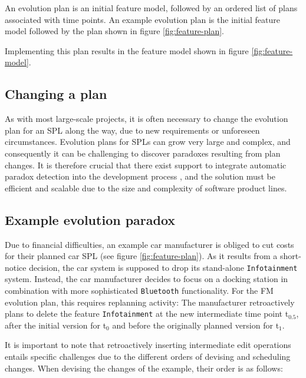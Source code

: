 \documentclass[a4paper,english]{ifimaster}
\newcommand{\timepoint}[1]{t$_#1$}
\begin{document}
An evolution plan is an initial feature model, followed by an ordered list of plans associated with time points. An example evolution plan is the initial feature model followed by the plan shown in figure \vref{fig:feature-plan}.

Implementing this plan results in the feature model shown in figure \vref{fig:feature-model}.

\subsection{Changing a plan}
\label{sub:changing-a-plan}
As with most large-scale projects, it is often necessary to change the evolution plan for an SPL along the way, due to new requirements or unforeseen circumstances.
Evolution plans for SPLs can grow very large and complex, and consequently it can be challenging to discover paradoxes resulting from plan changes.
It is therefore crucial that there exist support to integrate automatic paradox detection into the development process
, and the solution must be efficient and scalable due to the size and complexity of software product lines.

\newpage
\subsection{Example evolution paradox}
\label{sub:example-evolution-paradox}
Due to financial difficulties, an example car manufacturer is obliged to cut costs for their planned car SPL (see figure \vref{fig:feature-plan}).
As it results from a short-notice decision, the car system is supposed to drop its stand-alone \texttt{Infotainment} system.
Instead, the car manufacturer decides to focus on a docking station in combination with more sophisticated \texttt{Bluetooth} functionality.
For the FM evolution plan, this requires replanning activity:
The manufacturer retroactively plans to delete the feature \texttt{Infotainment} at the new intermediate time point \timepoint{0.5}, after the initial version for \timepoint{0} and before the originally planned version for \timepoint{1}.%


It is important to note that retroactively inserting intermediate edit operations entails specific challenges due to the different orders of devising and scheduling changes. When devising the changes of the example, their order is as follows:
\end{document}
